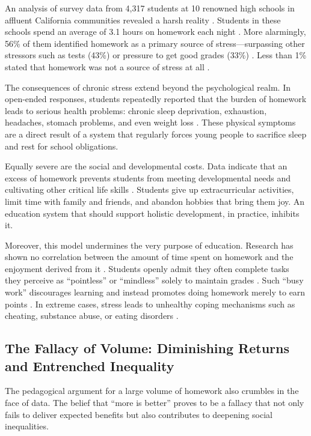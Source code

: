 \documentclass[12pt,a4paper]{article}
\begin{document}
An analysis of survey data from 4{,}317 students at 10 renowned high schools in affluent California communities revealed a harsh reality \autocite{pope2013}. Students in these schools spend an average of 3.1 hours on homework each night \autocite{pope2013}. More alarmingly, 56\% of them identified homework as a primary source of stress---surpassing other stressors such as tests (43\%) or pressure to get good grades (33\%) \autocite{pope2013}. Less than 1\% stated that homework was not a source of stress at all \autocite{pope2013}.

The consequences of chronic stress extend beyond the psychological realm. In open-ended responses, students repeatedly reported that the burden of homework leads to serious health problems: chronic sleep deprivation, exhaustion, headaches, stomach problems, and even weight loss \autocite{pope2013,pope_health}. These physical symptoms are a direct result of a system that regularly forces young people to sacrifice sleep and rest for school obligations.

Equally severe are the social and developmental costs. Data indicate that an excess of homework prevents students from meeting developmental needs and cultivating other critical life skills \autocite{pope2013}. Students give up extracurricular activities, limit time with family and friends, and abandon hobbies that bring them joy. An education system that should support holistic development, in practice, inhibits it.

Moreover, this model undermines the very purpose of education. Research has shown no correlation between the amount of time spent on homework and the enjoyment derived from it \autocite{pope2013}. Students openly admit they often complete tasks they perceive as \enquote{pointless} or \enquote{mindless} solely to maintain grades \autocite{pope2013}. Such \enquote{busy work} discourages learning and instead promotes doing homework merely to earn points \autocite{pope2013}. In extreme cases, stress leads to unhealthy coping mechanisms such as cheating, substance abuse, or eating disorders \autocite{pope2022}.

\subsection{The Fallacy of Volume: Diminishing Returns and Entrenched Inequality}
The pedagogical argument for a large volume of homework also crumbles in the face of data. The belief that \enquote{more is better} proves to be a fallacy that not only fails to deliver expected benefits but also contributes to deepening social inequalities.
\end{document}
